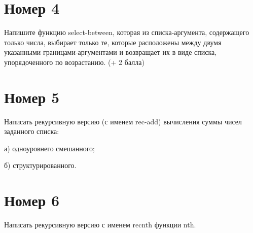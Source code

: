 \begin{figure}[H]
    \begin{listingbox}{}
        
    \end{listingbox}
    \label{lst:3}
\end{figure}

\section{Номер 4}

Напишите функцию select-between, которая из списка-аргумента, содержащего
только числа, выбирает только те, которые расположены между двумя указанными 
границами-аргументами и возвращает их в виде списка, упорядоченного по возрастанию.
(+ 2 балла)

\begin{figure}[H]
    \begin{listingbox}{}
        
    \end{listingbox}
    \label{lst:4}
\end{figure}

\section{Номер 5}

Написать рекурсивную версию (с именем rec-add) вычисления суммы чисел заданного
списка:

а) одноуровнего смешанного;

\begin{figure}[H]
    \begin{listingbox}{}
        
    \end{listingbox}
\end{figure}

б) структурированного.

\begin{figure}[H]
    \begin{listingbox}{}
        
    \end{listingbox}
\end{figure}

\section{Номер 6}

Написать рекурсивную версию с именем recnth функции nth.

